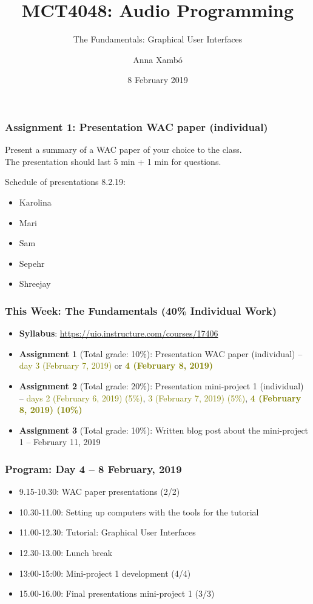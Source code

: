 \documentclass[screen, aspectratio=43]{beamer}
\title[AP-intro]{MCT4048: Audio Programming}
\subtitle{The Fundamentals: Graphical User Interfaces}
\author[A. Xamb{\'o}]{Anna Xamb{\'o}}
\institute[NTNU]{Department of Music, NTNU}
\date{8 February 2019}
\begin{document}
\begin{frame}
  \titlepage
\end{frame}

%
\begin{frame}
\frametitle{Assignment 1: Presentation WAC paper (individual)}

Present a summary of a WAC paper of your choice to the class.\\ 
The presentation should last 5 min + 1 min for questions.

\vspace{10 mm}

Schedule of presentations 8.2.19:
\begin{itemize}
\item Karolina
\item Mari
\item Sam
\item Sepehr
\item Shreejay
\end{itemize}
\end{frame}
%
\begin{frame}
\frametitle{This Week: The Fundamentals (40\% Individual Work)}
\begin{itemize}
\item \textbf{Syllabus}: \url{https://uio.instructure.com/courses/17406}
\item \textbf{Assignment 1} (Total grade: 10\%): Presentation WAC paper (individual) -- \textcolor{olive}{day 3 (February 7, 2019)} or \textbf{\textcolor{olive}{4 (February 8, 2019)}}
\item \textbf{Assignment 2} (Total grade: 20\%): Presentation mini-project 1 (individual) -- \textcolor{olive}{days 2 (February 6, 2019) (5\%)}, \textcolor{olive}{3 (February 7, 2019) (5\%)}, \textbf{\textcolor{olive}{4 (February 8, 2019) (10\%)}}
\item \textbf{Assignment 3} (Total grade: 10\%): Written blog post about the mini-project 1 -- February 11, 2019
\end{itemize}
\end{frame}
%
\begin{frame}
\frametitle{Program: Day 4 -- 8 February, 2019}
\begin{itemize}
\item 9.15-10.30: WAC paper presentations (2/2)
\item 10.30-11.00: Setting up computers with the tools for the tutorial
\item 11.00-12.30: Tutorial: Graphical User Interfaces
\item 12.30-13.00: Lunch break
\item 13:00-15:00: Mini-project 1 development (4/4)
\item 15.00-16.00: Final presentations mini-project 1 (3/3)
\end{itemize}
\end{frame}
\end{document}
